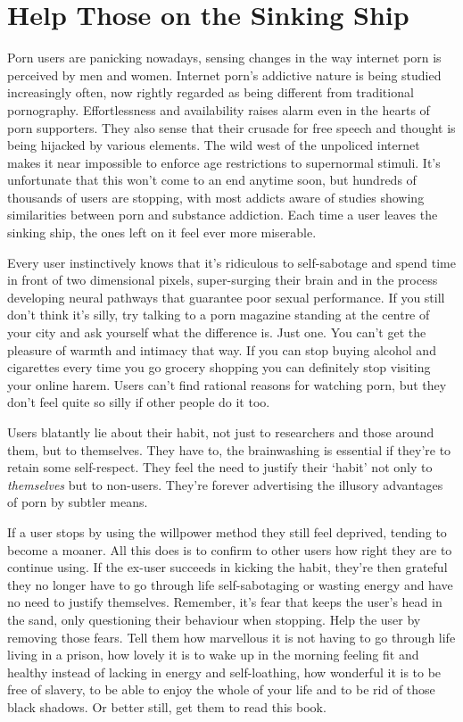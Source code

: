 \documentclass[
]{book}
\begin{document}
\hypertarget{help-those-on-the-sinking-ship}{%
\chapter{Help Those on the Sinking Ship}\label{help-those-on-the-sinking-ship}}

Porn users are panicking nowadays, sensing changes in the way internet porn is perceived by men and women. Internet porn's addictive nature is being studied increasingly often, now rightly regarded as being different from traditional pornography. Effortlessness and availability raises alarm even in the hearts of porn supporters. They also sense that their crusade for free speech and thought is being hijacked by various elements. The wild west of the unpoliced internet makes it near impossible to enforce age restrictions to supernormal stimuli. It's unfortunate that this won't come to an end anytime soon, but hundreds of thousands of users are stopping, with most addicts aware of studies showing similarities between porn and substance addiction. Each time a user leaves the sinking ship, the ones left on it feel ever more miserable.

Every user instinctively knows that it's ridiculous to self-sabotage and spend time in front of two dimensional pixels, super-surging their brain and in the process developing neural pathways that guarantee poor sexual performance. If you still don't think it's silly, try talking to a porn magazine standing at the centre of your city and ask yourself what the difference is. Just one. You can't get the pleasure of warmth and intimacy that way. If you can stop buying alcohol and cigarettes every time you go grocery shopping you can definitely stop visiting your online harem. Users can't find rational reasons for watching porn, but they don't feel quite so silly if other people do it too.

Users blatantly lie about their habit, not just to researchers and those around them, but to themselves. They have to, the brainwashing is essential if they're to retain some self-respect. They feel the need to justify their `habit' not only to \emph{themselves} but to non-users. They're forever advertising the illusory advantages of porn by subtler means.

If a user stops by using the willpower method they still feel deprived, tending to become a moaner. All this does is to confirm to other users how right they are to continue using. If the ex-user succeeds in kicking the habit, they're then grateful they no longer have to go through life self-sabotaging or wasting energy and have no need to justify themselves. Remember, it's fear that keeps the user's head in the sand, only questioning their behaviour when stopping. Help the user by removing those fears. Tell them how marvellous it is not having to go through life living in a prison, how lovely it is to wake up in the morning feeling fit and healthy instead of lacking in energy and self-loathing, how wonderful it is to be free of slavery, to be able to enjoy the whole of your life and to be rid of those black shadows. Or better still, get them to read this book.
\end{document}

